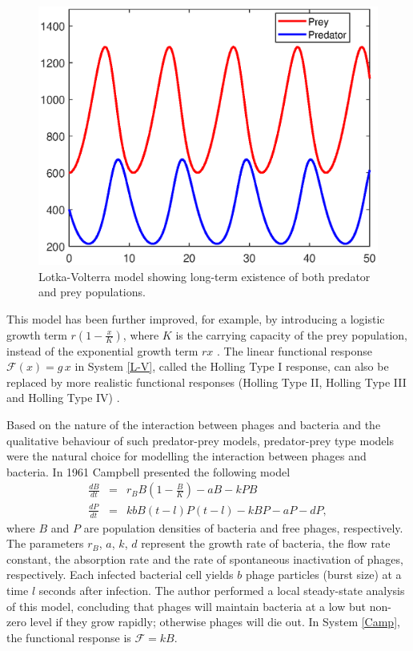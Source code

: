 \begin{figure}[t]
\captionsetup[subfigure]{labelformat=empty}
\centering
\includegraphics[scale=0.65]{lotka.eps}
\caption{Lotka-Volterra model showing long-term existence of both predator and prey populations.}
\label{fig:lotka}
\end{figure}

This model has been further improved, for example, by introducing a logistic growth term $r (1-\frac{x}{K})$, where $K$ is the carrying capacity of the prey population, instead of the exponential growth term $r x$ \cite{nisbet_modelling_1982}.  The linear functional response $ \mathcal{F}(x) =  g \,x$ in System \ref{L-V}, called the Holling Type I response, can also be replaced by more realistic functional responses (Holling Type II, Holling Type III and Holling Type IV) \citep{dawes_derivation_2013}.   

Based on the nature of the interaction between phages and bacteria and the qualitative behaviour of such predator-prey models, predator-prey type models were the natural choice for modelling the interaction between phages and bacteria. In 1961 Campbell \cite{campbell_conditions_1961} presented the following model 
\begin{eqnarray}\label{Camp}
\frac{dB}{dt} & =& r_{B} B \left(1-\frac{B}{K}\right) - aB -  k PB \nonumber\\
\frac{dP}{dt} &=& k b B(t-l) P(t-l) - k BP - a P - d P ,
\end{eqnarray}
where $B$ and $P$ are population densities of bacteria and free phages, respectively. The parameters $r_B$, $a$, $k$, $d$ represent the growth rate of bacteria, the flow rate constant, the absorption rate and the rate of spontaneous inactivation of phages, respectively.  Each infected bacterial cell yields $b$ phage particles (burst size) at a time $l$ seconds after infection. The author performed a local steady-state analysis of this model, concluding that phages will maintain bacteria at a low but non-zero level if they grow rapidly; otherwise phages will die out. In System \ref{Camp}, the functional response is $\mathcal{F} = k B$. 


